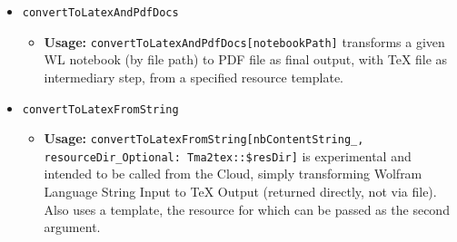 \begin{itemize}
\begin{itemize}
        \item \texttt{convertToLatexAndPdfDocs}
        \begin{itemize}
            \item \textbf{Usage:} \texttt{convertToLatexAndPdfDocs[notebookPath]} transforms a given WL notebook (by file path) to PDF file as final output, with TeX file as intermediary step, from a specified resource template.
        \end{itemize}
        
        \item \texttt{convertToLatexFromString}
        \begin{itemize}
            \item \textbf{Usage:} \texttt{convertToLatexFromString[nbContentString\_, resourceDir\_Optional: Tma2tex::\$resDir]} is experimental and intended to be called from the Cloud, simply transforming Wolfram Language String Input to TeX Output (returned directly, not via file). Also uses a template, the resource for which can be passed as the second argument.
        \end{itemize}
    \end{itemize}


\end{itemize}
